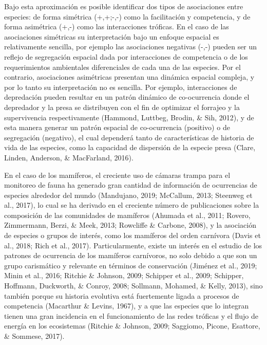 \documentclass[12pt,twoside]{reedthesis}
\begin{document}
Bajo esta aproximación es posible identificar dos tipos de asociaciones entre especies: de forma simétrica (+,+;-,-) como la facilitación y competencia, y de forma asimétrica (+,-) como las interacciones tróficas. En el caso de las asociaciones simétricas su interpretación bajo un enfoque espacial es relativamente sencilla, por ejemplo las asociaciones negativas (-,-) pueden ser un reflejo de segregación espacial dada por interacciones de competencia o de los requerimientos ambientales diferenciales de cada una de las especies. Por el contrario, asociaciones asimétricas presentan una dinámica espacial compleja, y por lo tanto su interpretación no es sencilla. Por ejemplo, interacciones de depredación pueden resultar en un patrón dinámico de co-ocurrencia donde el depredador y la presa se distribuyen con el fin de optimizar el forrajeo y la supervivencia respectivamente (Hammond, Luttbeg, Brodin, \& Sih, 2012), y de esta manera generar un patrón espacial de co-ocurrencia (positivo) o de segregación (negativo), el cual dependerá tanto de características de historia de vida de las especies, como la capacidad de dispersión de la especie presa (Clare, Linden, Anderson, \& MacFarland, 2016).

En el caso de los mamíferos, el creciente uso de cámaras trampa para el monitoreo de fauna ha generado gran cantidad de información de ocurrencias de especies alrededor del mundo (Mandujano, 2019; McCallum, 2013; Steenweg et al., 2017), lo cual se ha derivado en el creciente número de publicaciones sobre la composición de las comunidades de mamíferos (Ahumada et al., 2011; Rovero, Zimmermann, Berzi, \& Meek, 2013; Rowcliffe \& Carbone, 2008), y la asociación de especies o grupos de interés, como los mamíferos del orden carnívora (Davis et al., 2018; Rich et al., 2017). Particularmente, existe un interés en el estudio de los patrones de ocurrencia de los mamíferos carnívoros, no solo debido a que son un grupo carismático y relevante en términos de conservación (Jiménez et al., 2019; Minin et al., 2016; Ritchie \& Johnson, 2009; Schipper et al., 2009; Schipper, Hoffmann, Duckworth, \& Conroy, 2008; Sollmann, Mohamed, \& Kelly, 2013), sino también porque su historia evolutiva está fuertemente ligada a procesos de competencia (Macarthur \& Levins, 1967), y a que las especies que lo integran tienen una gran incidencia en el funcionamiento de las redes tróficas y el flujo de energía en los ecosistemas (Ritchie \& Johnson, 2009; Saggiomo, Picone, Esattore, \& Sommese, 2017).
\end{document}
